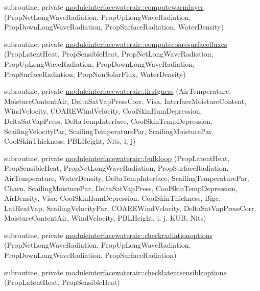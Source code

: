 \begin{DoxyCompactItemize}
\item 
subroutine, private \mbox{\hyperlink{namespacemoduleinterfacewaterair_a4dbe6db87de8afe751f851ce37f72dda}{moduleinterfacewaterair\+::computewarmlayer}} (Prop\+Net\+Long\+Wave\+Radiation, Prop\+Up\+Long\+Wave\+Radiation, Prop\+Down\+Long\+Wave\+Radiation, Prop\+Surface\+Radiation, Water\+Density)
\item 
subroutine, private \mbox{\hyperlink{namespacemoduleinterfacewaterair_a542e31b196bb8758541444a1a4f7bd77}{moduleinterfacewaterair\+::computecoaresurfacefluxes}} (Prop\+Latent\+Heat, Prop\+Sensible\+Heat, Prop\+Net\+Long\+Wave\+Radiation, Prop\+Up\+Long\+Wave\+Radiation, Prop\+Down\+Long\+Wave\+Radiation, Prop\+Surface\+Radiation, Prop\+Non\+Solar\+Flux, Water\+Density)
\item 
subroutine, private \mbox{\hyperlink{namespacemoduleinterfacewaterair_ae6acdb7a76bd3e0edd25e31a74d3ab48}{moduleinterfacewaterair\+::firstguess}} (Air\+Temperature, Moisture\+Content\+Air, Delta\+Sat\+Vap\+Press\+Corr, Visa, Interface\+Moisture\+Content, Wind\+Velocity, C\+O\+A\+R\+E\+Wind\+Velocity, Cool\+Skin\+Hum\+Depression, Delta\+Sat\+Vap\+Press, Delta\+Temp\+Interface, Cool\+Skin\+Temp\+Depression, Scailing\+Velocity\+Par, Scailing\+Temperature\+Par, Scailing\+Moisture\+Par, Cool\+Skin\+Thickness, P\+B\+L\+Height, Nits, i, j)
\item 
subroutine, private \mbox{\hyperlink{namespacemoduleinterfacewaterair_adca22635eac17186131c131155bfb929}{moduleinterfacewaterair\+::bulkloop}} (Prop\+Latent\+Heat, Prop\+Sensible\+Heat, Prop\+Net\+Long\+Wave\+Radiation, Prop\+Surface\+Radiation, Air\+Temperature, Water\+Density, Delta\+Temp\+Interface, Scailing\+Temperature\+Par, Charn, Scailing\+Moisture\+Par, Delta\+Sat\+Vap\+Press, Cool\+Skin\+Temp\+Depression, Air\+Density, Visa, Cool\+Skin\+Hum\+Depression, Cool\+Skin\+Thickness, Bigc, Lat\+Heat\+Vap, Scailing\+Velocity\+Par, C\+O\+A\+R\+E\+Wind\+Velocity, Delta\+Sat\+Vap\+Press\+Corr, Moisture\+Content\+Air, Wind\+Velocity, P\+B\+L\+Height, i, j, K\+UB, Nits)
\item 
subroutine, private \mbox{\hyperlink{namespacemoduleinterfacewaterair_a285710ae41f9eb54923e88dfcaf64681}{moduleinterfacewaterair\+::checkradiationoptions}} (Prop\+Net\+Long\+Wave\+Radiation, Prop\+Up\+Long\+Wave\+Radiation, Prop\+Down\+Long\+Wave\+Radiation, Prop\+Surface\+Radiation)
\item 
subroutine, private \mbox{\hyperlink{namespacemoduleinterfacewaterair_a7ad682cf919390b70351f87d094eb4fb}{moduleinterfacewaterair\+::checklatentsensibleoptions}} (Prop\+Latent\+Heat, Prop\+Sensible\+Heat)

\end{DoxyCompactItemize}
